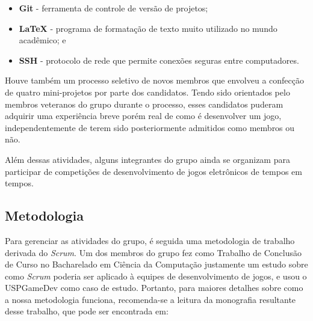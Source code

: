 \documentclass[12pt,onecolumn,a4paper]{article}
\begin{document}
        \begin{itemize}
        
            \item {\bf Git \footnotemark} - ferramenta de controle de versão de projetos;
            
            \item {\bf \LaTeX \footnotemark} - programa de formatação de texto muito utilizado no
                                               mundo acadêmico; e
            
            \item {\bf SSH \footnotemark} - protocolo de rede que permite conexões seguras entre
                                            computadores.
        
        \end{itemize}
        
        Houve também um processo seletivo de novos membros que envolveu a confecção de quatro
        mini-projetos por parte dos candidatos. Tendo sido orientados pelo membros veteranos do
        grupo durante o processo, esses candidatos puderam adquirir uma experiência breve porém real
        de como é desenvolver um jogo, independentemente de terem sido posteriormente admitidos como
        membros ou não.
        
        Além dessas atividades, alguns integrantes do grupo ainda se organizam para participar de
        competições de desenvolvimento de jogos eletrônicos de tempos em tempos.
    
    \subsection{Metodologia}
        Para gerenciar as atividades do grupo, é seguida uma metodologia de trabalho derivada do
        {\it Scrum}. Um dos membros do grupo fez como Trabalho de Conclusão de Curso no Bacharelado
        em Ciência da Computação justamente um estudo sobre como {\it Scrum} poderia ser aplicado à
        equipes de desenvolvimento de jogos, e usou o USPGameDev como caso de estudo. Portanto, para
        maiores detalhes sobre como a nossa metodologia funciona, recomenda-se a leitura da
        monografia resultante desse trabalho, que pode ser encontrada em:
        
\end{document}
